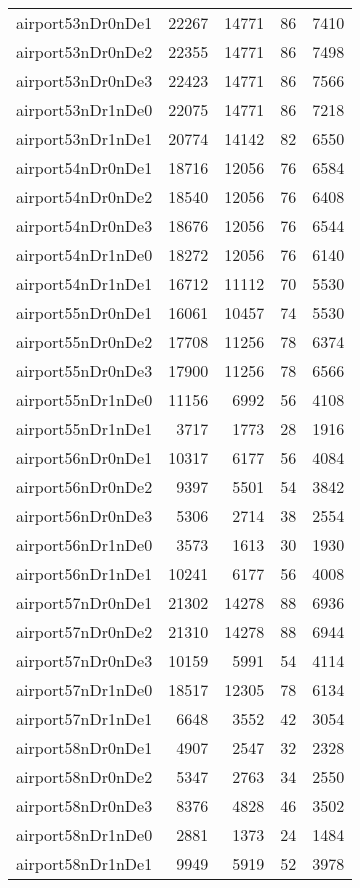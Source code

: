 \begin{longtable}{lrrrr}
airport53nDr0nDe1 & 22267 & 14771 & 86 & 7410 \\
airport53nDr0nDe2 & 22355 & 14771 & 86 & 7498 \\
airport53nDr0nDe3 & 22423 & 14771 & 86 & 7566 \\
airport53nDr1nDe0 & 22075 & 14771 & 86 & 7218 \\
airport53nDr1nDe1 & 20774 & 14142 & 82 & 6550 \\
airport54nDr0nDe1 & 18716 & 12056 & 76 & 6584 \\
airport54nDr0nDe2 & 18540 & 12056 & 76 & 6408 \\
airport54nDr0nDe3 & 18676 & 12056 & 76 & 6544 \\
airport54nDr1nDe0 & 18272 & 12056 & 76 & 6140 \\
airport54nDr1nDe1 & 16712 & 11112 & 70 & 5530 \\
airport55nDr0nDe1 & 16061 & 10457 & 74 & 5530 \\
airport55nDr0nDe2 & 17708 & 11256 & 78 & 6374 \\
airport55nDr0nDe3 & 17900 & 11256 & 78 & 6566 \\
airport55nDr1nDe0 & 11156 & 6992 & 56 & 4108 \\
airport55nDr1nDe1 & 3717 & 1773 & 28 & 1916 \\
airport56nDr0nDe1 & 10317 & 6177 & 56 & 4084 \\
airport56nDr0nDe2 & 9397 & 5501 & 54 & 3842 \\
airport56nDr0nDe3 & 5306 & 2714 & 38 & 2554 \\
airport56nDr1nDe0 & 3573 & 1613 & 30 & 1930 \\
airport56nDr1nDe1 & 10241 & 6177 & 56 & 4008 \\
airport57nDr0nDe1 & 21302 & 14278 & 88 & 6936 \\
airport57nDr0nDe2 & 21310 & 14278 & 88 & 6944 \\
airport57nDr0nDe3 & 10159 & 5991 & 54 & 4114 \\
airport57nDr1nDe0 & 18517 & 12305 & 78 & 6134 \\
airport57nDr1nDe1 & 6648 & 3552 & 42 & 3054 \\
airport58nDr0nDe1 & 4907 & 2547 & 32 & 2328 \\
airport58nDr0nDe2 & 5347 & 2763 & 34 & 2550 \\
airport58nDr0nDe3 & 8376 & 4828 & 46 & 3502 \\
airport58nDr1nDe0 & 2881 & 1373 & 24 & 1484 \\
airport58nDr1nDe1 & 9949 & 5919 & 52 & 3978 \\

\end{longtable}
